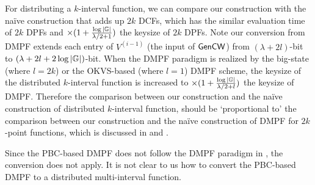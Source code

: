 For distributing a $k$-interval function, we can compare our construction with the na\"ive construction that adds up $2k$ DCFs, which has the similar evaluation time of $2k$ DPFs and $\times (1+\frac{\log |\mathbb{G}|}{\lambda/2+1})$ the keysize of $2k$ DPFs. Note our conversion from DMPF extends each entry of $V^{(i-1)}$ (the input of ${\sf Gen}{\sf CW}$) from $(\lambda +2l)$-bit to $(\lambda + 2l +2\log |\mathbb{G}|)$-bit. When the DMPF paradigm is realized by the big-state (where $l=2k$) or the OKVS-based (where $l=1$) DMPF scheme, the keysize of the distributed $k$-interval function is increased to $\times (1+\frac{\log|\mathbb{G}|}{\lambda/2+l})$ the keysize of DMPF. Therefore the comparison between our construction and the na\"ive construction of distributed $k$-interval function, should be `proportional to' the comparison between our construction and the na\"ive construction of DMPF for $2k$-point functions, which is discussed in  and .

\begin{remark}
  Since the PBC-based DMPF does not follow the DMPF paradigm in , the conversion does not apply. It is not clear to us how to convert the PBC-based DMPF to a distributed multi-interval function. 
\end{remark}